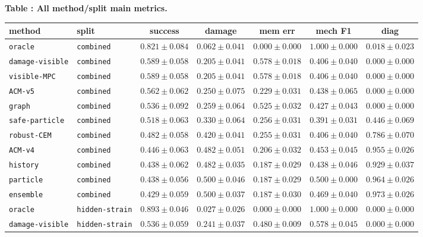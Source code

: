 \documentclass{article}
\begin{document}
\begin{center}
\label{tab:main-all}\textbf{Table \thetable: All method/split main metrics.}\\[0.4ex]
\begin{tabular}{llccccc}
\toprule
method & split & success & damage & mem err & mech F1 & diag \\
\midrule
\texttt{oracle} & \texttt{combined} & $0.821 \pm 0.084$ & $0.062 \pm 0.041$ & $0.000 \pm 0.000$ & $1.000 \pm 0.000$ & $0.018 \pm 0.023$ \\
\texttt{damage-visible} & \texttt{combined} & $0.589 \pm 0.058$ & $0.205 \pm 0.041$ & $0.578 \pm 0.018$ & $0.406 \pm 0.040$ & $0.000 \pm 0.000$ \\
\texttt{visible-MPC} & \texttt{combined} & $0.589 \pm 0.058$ & $0.205 \pm 0.041$ & $0.578 \pm 0.018$ & $0.406 \pm 0.040$ & $0.000 \pm 0.000$ \\
\texttt{ACM-v5} & \texttt{combined} & $0.562 \pm 0.062$ & $0.250 \pm 0.075$ & $0.229 \pm 0.031$ & $0.438 \pm 0.065$ & $0.000 \pm 0.000$ \\
\texttt{graph} & \texttt{combined} & $0.536 \pm 0.092$ & $0.259 \pm 0.064$ & $0.525 \pm 0.032$ & $0.427 \pm 0.043$ & $0.000 \pm 0.000$ \\
\texttt{safe-particle} & \texttt{combined} & $0.518 \pm 0.063$ & $0.330 \pm 0.064$ & $0.256 \pm 0.031$ & $0.391 \pm 0.031$ & $0.446 \pm 0.069$ \\
\texttt{robust-CEM} & \texttt{combined} & $0.482 \pm 0.058$ & $0.420 \pm 0.041$ & $0.255 \pm 0.031$ & $0.406 \pm 0.040$ & $0.786 \pm 0.070$ \\
\texttt{ACM-v4} & \texttt{combined} & $0.446 \pm 0.063$ & $0.482 \pm 0.051$ & $0.206 \pm 0.032$ & $0.453 \pm 0.045$ & $0.955 \pm 0.026$ \\
\texttt{history} & \texttt{combined} & $0.438 \pm 0.062$ & $0.482 \pm 0.035$ & $0.187 \pm 0.029$ & $0.438 \pm 0.046$ & $0.929 \pm 0.037$ \\
\texttt{particle} & \texttt{combined} & $0.438 \pm 0.056$ & $0.500 \pm 0.046$ & $0.187 \pm 0.029$ & $0.500 \pm 0.000$ & $0.964 \pm 0.026$ \\
\texttt{ensemble} & \texttt{combined} & $0.429 \pm 0.059$ & $0.500 \pm 0.037$ & $0.187 \pm 0.030$ & $0.469 \pm 0.040$ & $0.973 \pm 0.026$ \\
\texttt{oracle} & \texttt{hidden-strain} & $0.893 \pm 0.046$ & $0.027 \pm 0.026$ & $0.000 \pm 0.000$ & $1.000 \pm 0.000$ & $0.000 \pm 0.000$ \\
\texttt{damage-visible} & \texttt{hidden-strain} & $0.536 \pm 0.059$ & $0.241 \pm 0.037$ & $0.480 \pm 0.009$ & $0.578 \pm 0.045$ & $0.000 \pm 0.000$ \\

\end{tabular}
\end{center}
\end{document}
